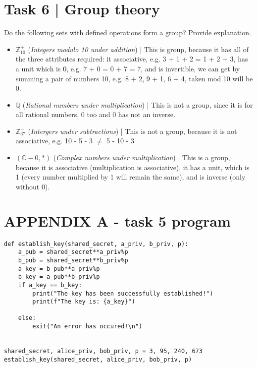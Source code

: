 \documentclass{article}
\begin{document}
\section*{Task 6 | Group theory}
Do the following sets with defined operations form a group? Provide explanation.
\begin{itemize}
    \item $\mathbb{Z}_{10}^+$ (\textit{Integers modulo 10 under addition}) | 
        This is group, because it has all of the three attributes required: it associative, 
        e.g. 3 + 1 + 2 =  1 + 2 + 3, has a unit which is 0, e.g. 7 + 0 = 0 + 7 = 7, and
        is invertible, we can get by summing a pair of numbers 10, e.g. 8 + 2, 9 + 1, 6 + 4,
        taken mod 10 will be 0.
    \item $\mathbb{Q}$ (\textit{Rational numbers under multiplication}) | This is not a group, 
        since it is for all rational numbers, 0 too and 0 has not an inverse.
    \item $\mathbb{Z}_{37}^-$ (\textit{Intergers under subtractions}) | This is not a group, because
        it is not associative, e.g. 10 - 5 - 3 $\ne$ 5 - 10 - 3
    \item $(\mathbb{C} - 0, *)$ (\textit{Complex numbers under multiplication}) | This is a group, 
        because it is associative (multiplication is associative), it has a unit, 
        which is 1 (every number multiplied by 1 will remain the same), and 
        is inverse (only without 0).
\end{itemize}

\pagebreak

\section*{APPENDIX A - task 5 program}
\begin{lstlisting}
def establish_key(shared_secret, a_priv, b_priv, p):
    a_pub = shared_secret**a_priv%p
    b_pub = shared_secret**b_priv%p
    a_key = b_pub**a_priv%p
    b_key = a_pub**b_priv%p
    if a_key == b_key:
        print("The key has been successfully established!")
        print(f"The key is: {a_key}")

    else:
        exit("An error has occured!\n")


shared_secret, alice_priv, bob_priv, p = 3, 95, 240, 673
establish_key(shared_secret, alice_priv, bob_priv, p)
\end{lstlisting}
\end{document}
